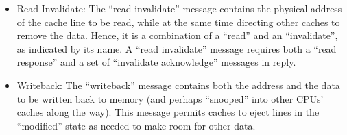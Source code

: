 \begin{itemize}
\item	Read Invalidate:
	The ``read invalidate'' message contains the physical address
	of the cache line to be read, while at the same time directing
	other caches to remove the data.
	Hence, it is a combination of a ``read'' and an ``invalidate'',
	as indicated by its name.
	A ``read invalidate'' message requires both a ``read response''
	and a set of ``invalidate acknowledge'' messages in reply.
\item	Writeback:
	The ``writeback'' message contains both the address and the
	data to be written back to memory (and perhaps ``snooped''
	into other CPUs' caches along the way).
	This message permits caches to eject lines in the ``modified''
	state as needed to make room for other data.
\fi
\end{itemize}

